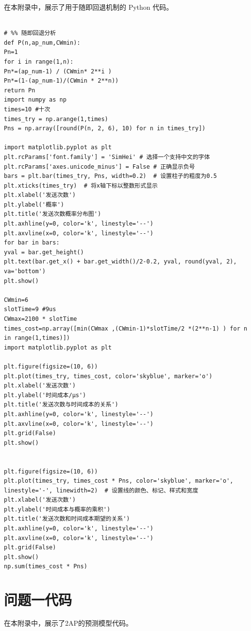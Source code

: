 \documentclass[bwprint]{gmcmthesis}
\begin{document}
\noindent 在本附录中，展示了用于随即回退机制的 Python 代码。

\begin{lstlisting}

# %% 随即回退分析
def P(n,ap_num,CWmin):
Pn=1
for i in range(1,n):
Pn*=(ap_num-1) / (CWmin* 2**i )
Pn*=(1-(ap_num-1)/(CWmin * 2**n))
return Pn
import numpy as np
times=10 #十次
times_try = np.arange(1,times)
Pns = np.array([round(P(n, 2, 6), 10) for n in times_try])

import matplotlib.pyplot as plt
plt.rcParams['font.family'] = 'SimHei' # 选择一个支持中文的字体
plt.rcParams['axes.unicode_minus'] = False # 正确显示负号
bars = plt.bar(times_try, Pns, width=0.2)  # 设置柱子的粗度为0.5
plt.xticks(times_try)  # 将x轴下标以整数形式显示
plt.xlabel('发送次数')
plt.ylabel('概率')
plt.title('发送次数概率分布图')
plt.axhline(y=0, color='k', linestyle='--')
plt.axvline(x=0, color='k', linestyle='--')
for bar in bars:
yval = bar.get_height()
plt.text(bar.get_x() + bar.get_width()/2-0.2, yval, round(yval, 2), va='bottom')
plt.show()

CWmin=6
slotTime=9 #9us
CWmax=2100 * slotTime
times_cost=np.array([min(CWmax ,(CWmin-1)*slotTime/2 *(2**n-1) ) for n in range(1,times)])
import matplotlib.pyplot as plt

plt.figure(figsize=(10, 6))
plt.plot(times_try, times_cost, color='skyblue', marker='o')
plt.xlabel('发送次数')
plt.ylabel('时间成本/μs')
plt.title('发送次数与时间成本的关系')
plt.axhline(y=0, color='k', linestyle='--')
plt.axvline(x=0, color='k', linestyle='--')
plt.grid(False)
plt.show()


plt.figure(figsize=(10, 6))
plt.plot(times_try, times_cost * Pns, color='skyblue', marker='o', linestyle='-', linewidth=2)  # 设置线的颜色、标记、样式和宽度
plt.xlabel('发送次数')
plt.ylabel('时间成本与概率的乘积')
plt.title('发送次数和时间成本期望的关系')
plt.axhline(y=0, color='k', linestyle='--')
plt.axvline(x=0, color='k', linestyle='--')
plt.grid(False)
plt.show()
np.sum(times_cost * Pns)
\end{lstlisting}


\section{问题一代码}

\noindent 在本附录中，展示了2AP的预测模型代码。
\end{document}
